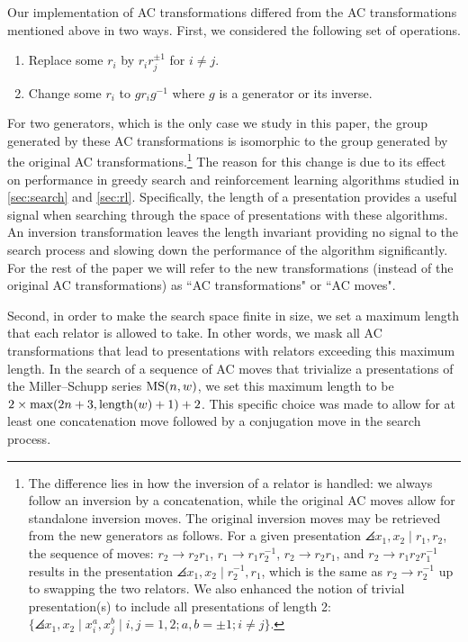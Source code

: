 Our implementation of AC transformations differed from the AC transformations mentioned above in two ways.
First, we considered the following set of operations.
\begin{enumerate}[label=(AC$'$\arabic*)]
	\item Replace some $r_i$ by $r_i r_j^{\pm 1}$ for $i \neq j$.
	\item Change some $r_i$ to $g r_i g^{-1}$ where $g$ is a generator or its inverse.
\end{enumerate}
For two generators, which is the only case we study in this paper, the group generated by these AC transformations is isomorphic to the group generated by the original AC transformations.\footnote{
The difference lies in how the inversion of a relator is handled: we always follow an inversion by a concatenation, while the original AC moves allow for standalone inversion moves.
The original inversion moves may be retrieved from the new generators as follows.
For a given presentation $\angles{x_1, x_2 \mid r_1, r_2}$, the sequence of moves: $r_2 \to r_2 r_1$, $r_1 \to r_1 r_2^{-1}$, $r_2 \to r_2 r_1$, and $r_2 \to r_1 r_2 r_1^{-1}$ results in the presentation $\angles{x_1, x_2 \mid r_2^{-1}, r_1}$, which is the same as $r_2 \to r_2^{-1}$ up to swapping the two relators.
We also enhanced the notion of trivial presentation(s) to include all presentations of length 2: $\{\angles{x_1, x_2 \mid x_i^{a}, x_j^{b}} \mid i, j = 1, 2; a, b = \pm 1; i \neq j \}$.
}
The reason for this change is due to its effect on performance in greedy search and reinforcement learning algorithms studied in \autoref{sec:search} and \autoref{sec:rl}.
Specifically, the length of a presentation provides a useful signal when searching through the space of presentations with these algorithms.
An inversion transformation leaves the length invariant providing no signal to the search process and slowing down the performance of the algorithm significantly.
For the rest of the paper we will refer to the new transformations (instead of the original AC transformations) as ``AC transformations" or ``AC moves".

Second, in order to make the search space finite in size, we set a maximum length that each relator is allowed to take. In other words, we mask all AC transformations that lead to presentations with relators exceeding this maximum length.
In the search of a sequence of AC moves that trivialize a presentations of the Miller--Schupp series $\text{MS}(n, w)$, we set this maximum length to be $2 \times \text{max}(2 n+3, \operatorname{length}(w)+1) + 2$.
This specific choice was made to allow for at least one concatenation move followed by a conjugation move in the search process.
